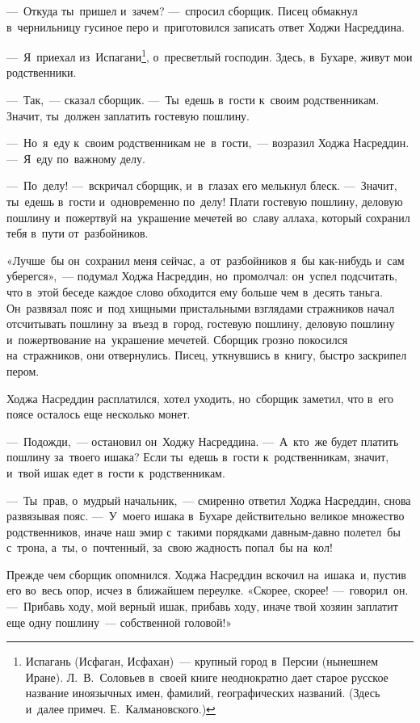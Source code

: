 \documentclass[12pt,a4paper]{book}
\begin{document}
—~Откуда ты~пришел и~зачем? —~спросил сборщик. Писец обмакнул в~чернильницу гусиное перо и~приготовился записать ответ Ходжи Насреддина.

—~Я~приехал из~Испагани\footnote{Испагань (Исфаган, Исфахан)~— крупный город в~Персии (нынешнем Иране). Л.~В.~Соловьев в~своей книге неоднократно дает старое русское название иноязычных имен, фамилий, географических названий. (Здесь и~далее примеч. Е.~Калмановского.)}, о~пресветлый господин. Здесь, в~Бухаре, живут мои родственники.

—~Так,~— сказал сборщик. —~Ты~едешь в~гости к~своим родственникам. Значит, ты~должен заплатить гостевую пошлину.

—~Но~я~еду к~своим родственникам не~в~гости,~— возразил Ходжа Насреддин. —~Я~еду по~важному делу.

—~По~делу! —~вскричал сборщик, и~в~глазах его мелькнул блеск. —~Значит, ты~едешь в~гости и~одновременно по~делу! Плати гостевую пошлину, деловую пошлину и~пожертвуй на~украшение мечетей во~славу аллаха, который сохранил тебя в~пути от~разбойников.

«Лучше~бы он~сохранил меня сейчас, а~от~разбойников я~бы как-нибудь и~сам уберегся»,~— подумал Ходжа Насреддин, но~промолчал: он~успел подсчитать, что в~этой беседе каждое слово обходится ему больше чем в~десять таньга. Он~развязал пояс и~под хищными пристальными взглядами стражников начал отсчитывать пошлину за~въезд в~город, гостевую пошлину, деловую пошлину и~пожертвование на~украшение мечетей. Сборщик грозно покосился на~стражников, они отвернулись. Писец, уткнувшись в~книгу, быстро заскрипел пером.

Ходжа Насреддин расплатился, хотел уходить, но~сборщик заметил, что в~его поясе осталось еще несколько монет.

—~Подожди,~— остановил он~Ходжу Насреддина. —~А~кто~же будет платить пошлину за~твоего ишака? Если ты~едешь в~гости к~родственникам, значит, и~твой ишак едет в~гости к~родственникам.

—~Ты~прав, о~мудрый начальник,~— смиренно ответил Ходжа Насреддин, снова развязывая пояс. —~У~моего ишака в~Бухаре действительно великое множество родственников, иначе наш эмир с~такими порядками давным-давно полетел~бы с~трона, а~ты, о~почтенный, за~свою жадность попал~бы на~кол!

Прежде чем сборщик опомнился. Ходжа Насреддин вскочил на~ишака~и, пустив его во~весь опор, исчез в~ближайшем переулке. «Скорее, скорее! —~говорил~он. —~Прибавь ходу, мой верный ишак, прибавь ходу, иначе твой хозяин заплатит еще одну пошлину~— собственной головой!»
\end{document}
